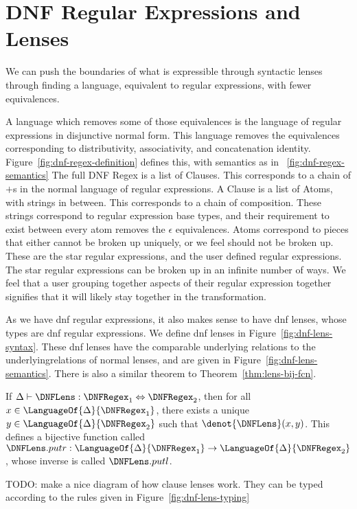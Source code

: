 \section{DNF Regular Expressions and Lenses}
We can push the boundaries of what is expressible through syntactic lenses
through finding a language, equivalent to regular expressions, with fewer
equivalences.

A language which removes some of those equivalences is the language of regular
expressions in disjunctive normal form.  This language removes the
equivalences corresponding to distributivity, associativity, and concatenation identity.
Figure~\ref{fig:dnf-regex-definition} defines this, with semantics as in
~\ref{fig:dnf-regex-semantics}
The full DNF Regex is a list of Clauses.  This corresponds to a chain of $+$s
in the normal language of regular expressions.
A Clause is a list of Atoms, with strings in between.
This corresponds to a chain of composition.  These strings
correspond to regular expression base types, and their requirement to
exist between every atom removes the $\epsilon$ equivalences.
Atoms correspond to pieces that either cannot be broken up uniquely, or we feel should not be broken up.
These are the star regular expressions, and the user defined regular expressions.
The star regular expressions can be broken up in an infinite number of ways.
We feel that a user grouping together aspects of their regular expression together
signifies that it will likely stay together in the transformation.

As we have dnf regular expressions, it also makes sense to have dnf lenses,
whose types are dnf regular expressions.  We define dnf lenses in Figure~\ref{fig:dnf-lens-syntax}.
These dnf lenses have the comparable underlying relations to the underlyingrelations 
of normal lenses, and are given in Figure~\ref{fig:dnf-lens-semantics}.
There is also a similar theorem to Theorem~\ref{thm:lens-bij-fcn}.
\begin{theorem}
\label{thm:dnf-lens-bij-fcn}
If $\Delta \vdash \DNFLens : \DNFRegex_1 \Leftrightarrow \DNFRegex_2$,
then for all $x \in \LanguageOf{\Delta}{\DNFRegex_1}$, there exists a unique $y \in \LanguageOf{\Delta}{\DNFRegex_2}$ such that $\denot{\DNFLens}(x,y)$.
This defines a bijective function called $\DNFLens.putr : \LanguageOf{\Delta}{\DNFRegex_1} \rightarrow \LanguageOf{\Delta}{\DNFRegex_2}$,
whose inverse is called $\DNFLens.putl$.
\end{theorem}
TODO: make a nice diagram of how clause lenses work.
They can be typed according to the rules given in Figure~\ref{fig:dnf-lens-typing}


